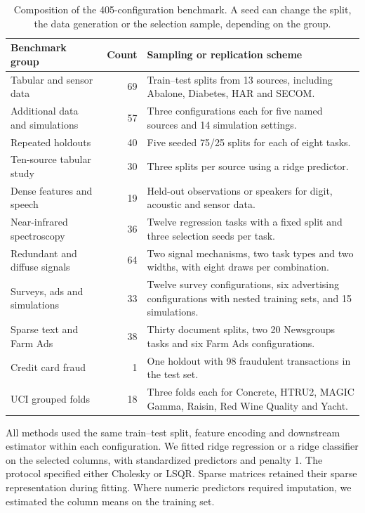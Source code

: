 \documentclass[11pt,a4paper]{article}
\begin{document}
\begin{table}[htbp]\centering\small
\caption{Composition of the 405-configuration benchmark. A seed can change the split, the data generation or the selection sample, depending on the group.}\label{tab:cohorts}
\begin{tabularx}{\linewidth}{@{}l r >{\raggedright\arraybackslash}X@{}}
\toprule
Benchmark group & Count & Sampling or replication scheme \\
\midrule
Tabular and sensor data & 69 & Train--test splits from 13 sources, including Abalone, Diabetes, HAR and SECOM.\\
Additional data and simulations & 57 & Three configurations each for five named sources and 14 simulation settings.\\
Repeated holdouts & 40 & Five seeded 75/25 splits for each of eight tasks.\\
Ten-source tabular study & 30 & Three splits per source using a ridge predictor.\\
Dense features and speech & 19 & Held-out observations or speakers for digit, acoustic and sensor data.\\
Near-infrared spectroscopy & 36 & Twelve regression tasks with a fixed split and three selection seeds per task.\\
Redundant and diffuse signals & 64 & Two signal mechanisms, two task types and two widths, with eight draws per combination.\\
Surveys, ads and simulations & 33 & Twelve survey configurations, six advertising configurations with nested training sets, and 15 simulations.\\
Sparse text and Farm Ads & 38 & Thirty document splits, two 20 Newsgroups tasks and six Farm Ads configurations.\\
Credit card fraud & 1 & One holdout with 98 fraudulent transactions in the test set.\\
UCI grouped folds & 18 & Three folds each for Concrete, HTRU2, MAGIC Gamma, Raisin, Red Wine Quality and Yacht.\\
\bottomrule
\end{tabularx}
\end{table}

All methods used the same train--test split, feature encoding and downstream estimator within each configuration. We fitted ridge regression or a ridge classifier on the selected columns, with standardized predictors and penalty 1. The protocol specified either Cholesky or LSQR. Sparse matrices retained their sparse representation during fitting. Where numeric predictors required imputation, we estimated the column means on the training set.
\end{document}
